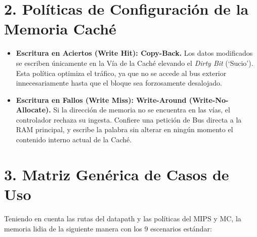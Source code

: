 \documentclass[a4paper,11pt]{article}
\begin{document}
\section*{2.\; Pol\'iticas de Configuraci\'on de la Memoria Cach\'e}

\begin{itemize}[leftmargin=1.5em]
  \item \textbf{Escritura en Aciertos (Write Hit): Copy-Back.}
        Los datos modificados se escriben \'unicamente en la V\'ia de la Cach\'e elevando el \textit{Dirty Bit} (`Sucio'). Esta pol\'itica optimiza el tr\'afico, ya que no se accede al bus exterior innecesariamente hasta que el bloque sea forzosamente desalojado.
  \item \textbf{Escritura en Fallos (Write Miss): Write-Around (Write-No-Allocate).}
        Si la direcci\'on de memoria no se encuentra en las v\'ias, el controlador rechaza su ingesta. Confiere una petici\'on de Bus directa a la RAM principal, y escribe la palabra sin alterar en ning\'un momento el contenido interno actual de la Cach\'e.
\end{itemize}

\bigskip

\section*{3.\; Matriz Gen\'erica de Casos de Uso}

Teniendo en cuenta las rutas del datapath y las pol\'iticas del MIPS y MC, la memoria lidia de la siguiente manera con los 9 escenarios est\'andar:

\renewcommand{\arraystretch}{1.25}
\end{document}
